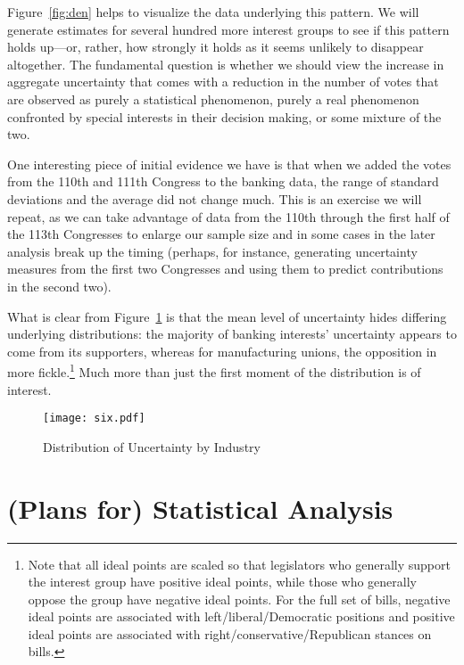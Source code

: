 \documentclass[12pt]{article}
\begin{document}
Figure~\ref{fig:den} helps to visualize the data underlying this pattern. We will generate estimates for several hundred more interest groups to see if this pattern holds up---or, rather, how strongly it holds as it seems unlikely to disappear altogether. The fundamental question is whether we should view the increase in aggregate uncertainty that comes with a reduction in the number of votes that are observed as purely a statistical phenomenon, purely a real phenomenon confronted by special interests in their decision making, or some mixture of the two.

One interesting piece of initial evidence we have is that when we added the votes from the 110th and 111th Congress to the banking data, the range of standard deviations and the average did not change much. This is an exercise we will repeat, as we can take advantage of data from the 110th through the first half of the 113th Congresses to enlarge our sample size and in some cases in the later analysis break up the timing (perhaps, for instance, generating uncertainty measures from the first two Congresses and using them to predict contributions in the second two).

What is clear from Figure~\ref{fig:six} is that the mean level of uncertainty hides differing underlying distributions: the majority of banking interests' uncertainty appears to come from its supporters, whereas for manufacturing unions, the opposition in more fickle.\footnote{Note that all ideal points are scaled so that legislators who generally support the interest group have positive ideal points, while those who generally oppose the group have negative ideal points. For the full set of bills, negative ideal points are associated with left/liberal/Democratic positions and positive ideal points are associated with right/conservative/Republican stances on bills.} Much more than just the first moment of the distribution is of interest.



\begin{figure}
\begin{center}
\texttt{[image: six.pdf]}
\end{center}
\caption{Distribution of Uncertainty by Industry\label{fig:six}}
\end{figure}
 


\section{(Plans for) Statistical Analysis}
\label{sec:dis}
\end{document}
